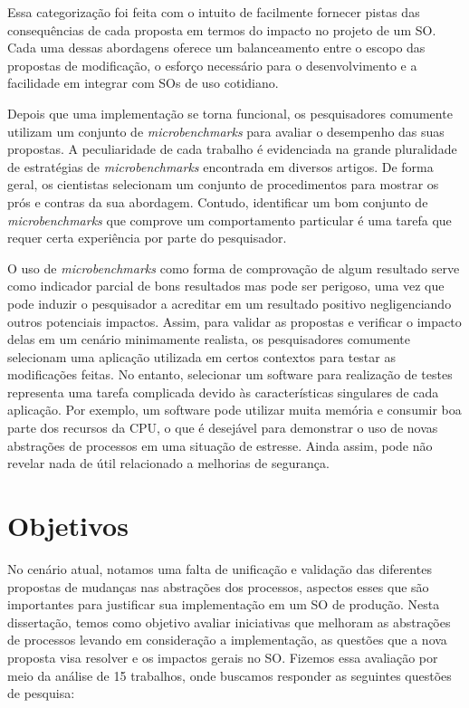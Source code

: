Essa categorização foi feita com o intuito de facilmente fornecer pistas das
consequências de cada proposta em termos do impacto no projeto de um SO. Cada
uma dessas abordagens oferece um balanceamento entre o escopo das propostas de
modificação, o esforço necessário para o desenvolvimento e a facilidade em
integrar com SOs de uso cotidiano.

Depois que uma implementação se torna funcional, os pesquisadores comumente
utilizam um conjunto de \emph{microbenchmarks} para avaliar o desempenho das
suas propostas. A peculiaridade de cada trabalho é evidenciada na grande
pluralidade de estratégias de \emph{microbenchmarks} encontrada em diversos
artigos.  De forma geral, os cientistas selecionam um conjunto de procedimentos
para mostrar os prós e contras da sua abordagem. Contudo, identificar um bom
conjunto de \emph{microbenchmarks} que comprove um comportamento particular é
uma tarefa que requer certa experiência por parte do pesquisador.

O uso de \textit{microbenchmarks} como forma de comprovação de algum resultado
serve como indicador parcial de bons resultados mas pode ser perigoso, uma vez
que pode induzir o pesquisador a acreditar em um resultado positivo
negligenciando outros potenciais impactos. Assim, para validar as propostas e
verificar o impacto delas em um cenário minimamente realista, os pesquisadores
comumente selecionam uma aplicação utilizada em certos contextos para testar as
modificações feitas. No entanto, selecionar um software para realização de
testes representa uma tarefa complicada devido às características singulares de
cada aplicação. Por exemplo, um software pode utilizar muita memória e consumir
boa parte dos recursos da CPU, o que é desejável para demonstrar o uso de novas
abstrações de processos em uma situação de estresse. Ainda assim, pode não
revelar nada de útil relacionado a melhorias de segurança.

\section{Objetivos}

No cenário atual, notamos uma falta de unificação e validação das diferentes
propostas de mudanças nas abstrações dos processos, aspectos esses que são
importantes para justificar sua implementação em um SO de produção. Nesta
dissertação, temos como objetivo avaliar iniciativas que melhoram as abstrações de
processos levando em consideração a implementação, as questões que a nova
proposta visa resolver e os impactos gerais no SO. Fizemos essa avaliação por
meio da análise de 15 trabalhos, onde buscamos responder as seguintes
questões de pesquisa:

